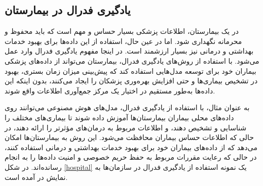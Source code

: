 %


\subsection{یادگیری فدرال در بیمارستان}
در یک بیمارستان، اطلاعات پزشکی بسیار حساس و مهم است که باید محفوظ و محرمانه نگهداری شود. اما در عین حال، استفاده از این داده‌ها برای بهبود خدمات بهداشتی و درمانی نیز بسیار ارزشمند است. در اینجا مفهوم یادگیری فدرال وارد عمل می‌شود. با استفاده از روش‌های یادگیری فدرال، بیمارستان می‌تواند از داده‌های پزشکی بیماران خود برای توسعه مدل‌هایی استفاده کند که پیش‌بینی میزان زمان بستری، بهبود در تشخیص بیماری‌ها و حتی افزایش بهره‌وری پزشکان را ایجاد می‌کنند، بدون اینکه این داده‌ها به‌طور مستقیم در اختیار یک مرکز جمع‌آوری اطلاعات واقع شوند.

به عنوان مثال، با استفاده از یادگیری فدرال، مدل‌های هوش مصنوعی می‌توانند روی داده‌های محلی بیماران بیمارستان‌ها آموزش داده شوند تا بیماری‌های مختلف را شناسایی و تشخیص دهند، و اطلاعات مربوط به درمان‌های مؤثرتر را ارائه دهند، در حالی که اطلاعات حساس بیماران محافظت می‌شود. این روش به بیمارستان‌ها امکان می‌دهد که از داده‌های بیماران خود برای بهبود خدمات بهداشتی و درمانی استفاده کنند، در حالی که رعایت مقررات مربوط به حفظ حریم خصوصی و امنیت داده‌ها را به انجام رسانده‌اند. در شکل
\ref{hospital}
یک نمونه استفاده از یادگیری فدرال در سازمان‌ها به نمایش در آمده است.



